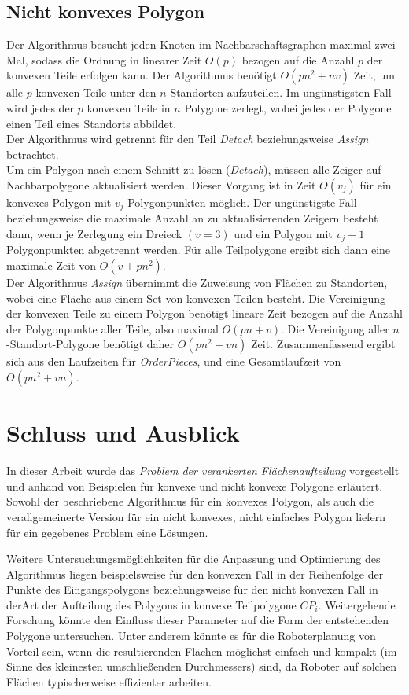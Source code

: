 \documentclass[ngerman]{seminarbeitrag}
\begin{document}
\subsection{Nicht konvexes Polygon}
Der Algorithmus \ord besucht jeden Knoten im Nachbarschaftsgraphen maximal zwei Mal, sodass die Ordnung in linearer Zeit $O(p)$ bezogen auf die Anzahl $p$ der konvexen Teile erfolgen kann.
Der Algorithmus \noncon benötigt $O(pn^{2} + nv)$ Zeit, um alle $p$ konvexen Teile unter den $n$ Standorten aufzuteilen. Im ungünstigsten Fall wird jedes der $p$ konvexen Teile in $n$ Polygone zerlegt, wobei jedes der Polygone einen Teil eines Standorts abbildet.\\
Der Algorithmus \daa wird getrennt für den Teil \emph{Detach} beziehungsweise \emph{Assign} betrachtet.\\
Um ein Polygon nach einem Schnitt zu lösen (\emph{Detach}), müssen alle Zeiger auf Nachbarpolygone aktualisiert werden. Dieser Vorgang ist in Zeit $O(v_{j})$ für ein konvexes Polygon mit $v_{j}$ Polygonpunkten möglich. Der ungünstigste Fall beziehungsweise die maximale Anzahl an zu aktualisierenden Zeigern besteht dann, wenn je Zerlegung ein Dreieck $(v=3)$ und ein Polygon mit $v_{j}+1$ Polygonpunkten abgetrennt werden. Für alle Teilpolygone ergibt sich dann eine maximale Zeit von $O(v + pn^{2})$.\\
Der Algorithmus \emph{Assign} übernimmt die Zuweisung von Flächen zu Standorten, wobei eine Fläche aus einem Set von konvexen Teilen besteht. Die Vereinigung der konvexen Teile zu einem Polygon benötigt lineare Zeit bezogen auf die Anzahl der Polygonpunkte aller Teile, also maximal $O(pn + v)$. Die Vereinigung aller $n$-Standort-Polygone benötigt daher $O(pn^{2}+ vn)$ Zeit. 
Zusammenfassend ergibt sich aus den Laufzeiten für \mbox{\textit{OrderPieces}}, \noncon und \daa eine Gesamtlaufzeit von $O(pn^{2} + vn)$.

\section{Schluss und Ausblick}\label{schluss}
In dieser Arbeit wurde das \emph{Problem der verankerten Flächenaufteilung} vorgestellt und anhand von Beispielen für konvexe und nicht konvexe Polygone erläutert.
Sowohl der beschriebene Algorithmus für ein konvexes Polygon, als auch die verallgemeinerte Version für ein nicht konvexes, nicht einfaches Polygon liefern für ein gegebenes Problem eine Lösungen.

Weitere Untersuchungsmöglichkeiten für die Anpassung und Optimierung des Algorithmus liegen beispielsweise für den konvexen Fall in der Reihenfolge der Punkte des Eingangspolygons beziehungsweise für den nicht konvexen Fall in derArt der Aufteilung des Polygons in konvexe Teilpolygone $CP_{i}$. Weitergehende Forschung könnte den Einfluss dieser Parameter auf die Form der entstehenden Polygone untersuchen. Unter anderem könnte es für die Roboterplanung von Vorteil sein, wenn die resultierenden Flächen möglichst einfach und kompakt (im Sinne des kleinesten umschließenden Durchmessers) sind, da Roboter auf solchen Flächen typischerweise effizienter arbeiten.
\end{document}
